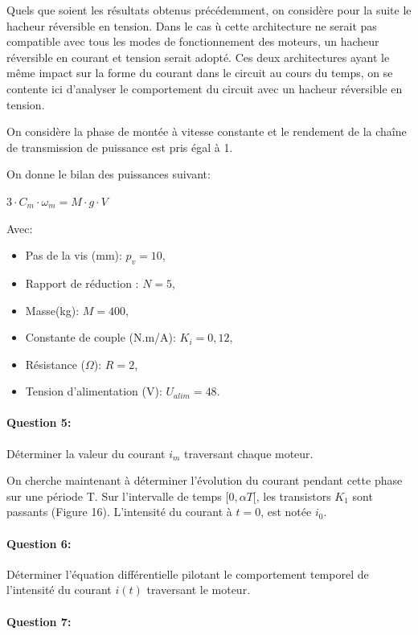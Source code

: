 Quels que soient les résultats obtenus précédemment, on considère pour la suite le hacheur réversible en
tension. Dans le cas ù cette architecture ne serait pas compatible avec tous les modes de fonctionnement
des moteurs, un hacheur réversible en courant et tension serait adopté. Ces deux architectures ayant le même
impact sur la forme du courant dans le circuit au cours du temps, on se contente ici d'analyser le comportement
du circuit avec un hacheur réversible en tension.

On considère la phase de montée à vitesse constante et le rendement de la chaîne de transmission de
puissance est pris égal à 1.

On donne le bilan des puissances suivant:

$3\cdot C_m\cdot\omega_m=M\cdot g\cdot V$

Avec:
\begin{itemize}
 \item Pas de la vis (mm): $p_v=10$,
 \item Rapport de réduction : $N=5$,
 \item Masse(kg): $M=400$,
 \item Constante de couple (N.m/A): $K_i=0,12$,
 \item Résistance ($\Omega$): $R=2$,
 \item Tension d'alimentation (V): $U_{alim}=48$.
\end{itemize}

\paragraph{Question 5:}

Déterminer la valeur du courant $i_m$ traversant chaque moteur.

On cherche maintenant à déterminer l'évolution du courant pendant cette phase sur une période T. Sur l'intervalle de temps $[0,\alpha T[$, les transistors $K_1$ sont passants (Figure 16). L'intensité du courant à $t = 0$, est
notée $i_0$.

\paragraph{Question 6:}

Déterminer l'équation différentielle pilotant le comportement temporel de l'intensité du courant $i(t)$ traversant le moteur.

\paragraph{Question 7:}

